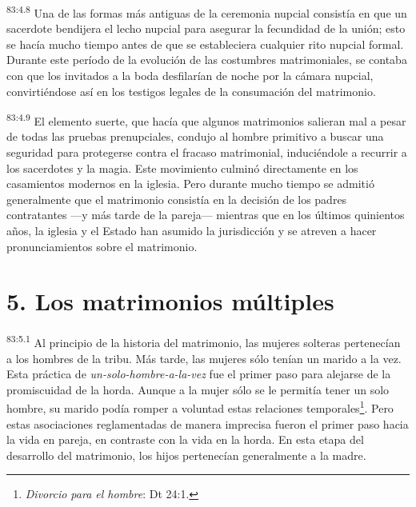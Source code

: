 \par
\textsuperscript{83:4.8} Una de las formas más antiguas de la ceremonia nupcial consistía en que un sacerdote bendijera el lecho nupcial para asegurar la fecundidad de la unión; esto se hacía mucho tiempo antes de que se estableciera cualquier rito nupcial formal. Durante este período de la evolución de las costumbres matrimoniales, se contaba con que los invitados a la boda desfilarían de noche por la cámara nupcial, convirtiéndose así en los testigos legales de la consumación del matrimonio.

\par
\textsuperscript{83:4.9} El elemento suerte, que hacía que algunos matrimonios salieran mal a pesar de todas las pruebas prenupciales, condujo al hombre primitivo a buscar una seguridad para protegerse contra el fracaso matrimonial, induciéndole a recurrir a los sacerdotes y la magia. Este movimiento culminó directamente en los casamientos modernos en la iglesia. Pero durante mucho tiempo se admitió generalmente que el matrimonio consistía en la decisión de los padres contratantes ---y más tarde de la pareja--- mientras que en los últimos quinientos años, la iglesia y el Estado han asumido la jurisdicción y se atreven a hacer pronunciamientos sobre el matrimonio.

\section*{5. Los matrimonios múltiples}
\par
\textsuperscript{83:5.1} Al principio de la historia del matrimonio, las mujeres solteras pertenecían a los hombres de la tribu. Más tarde, las mujeres sólo tenían un marido a la vez. Esta práctica de \textit{un-solo-hombre-a-la-vez} fue el primer paso para alejarse de la promiscuidad de la horda. Aunque a la mujer sólo se le permitía tener un solo hombre, su marido podía romper a voluntad estas relaciones temporales\footnote{\textit{Divorcio para el hombre}: Dt 24:1.}. Pero estas asociaciones reglamentadas de manera imprecisa fueron el primer paso hacia la vida en pareja, en contraste con la vida en la horda. En esta etapa del desarrollo del matrimonio, los hijos pertenecían generalmente a la madre.

